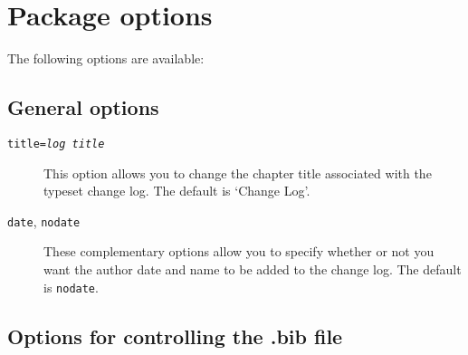 \documentclass[a4paper,12pt,twoside,openany]{memoir}
\begin{document}
\section{Package options}

The following options are available:

\subsection{General options}

\begin{description}

\item[\texttt{title=\textit{log title}}]
This option allows you to change the chapter title associated with 
the typeset change log.
The default is `Change Log'.

\item[\texttt{date}, \texttt{nodate}]
These complementary options
allow you to specify whether or not you want 
the author date and name to be added to the change log.
The default is \texttt{nodate}.


\end{description}

\subsection{Options for controlling the .bib file}
\end{document}
